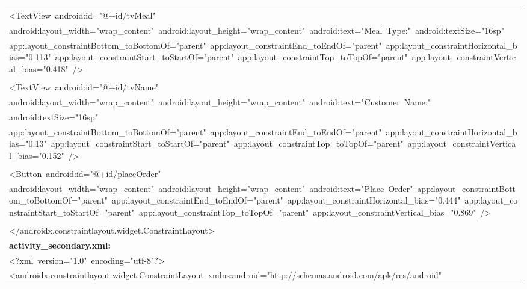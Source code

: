 \documentclass[a4paper,12pt]{article}
\begin{document}
\begin{longtable}{|p{}|}
\strut \\
{\ttfamily\small \textless{}TextView\ android:id="@+id/tvMeal"} \\
{\ttfamily\small android:layout\_width="wrap\_content"\ android:layout\_height="wrap\_content"\ android:text="Meal\ Type:"\ android:textSize="16sp"} \\
{\ttfamily\small app:layout\_constraintBottom\_toBottomOf="parent"\ app:layout\_constraintEnd\_toEndOf="parent"\ app:layout\_constraintHorizontal\_bias="0.113"\ app:layout\_constraintStart\_toStartOf="parent"\ app:layout\_constraintTop\_toTopOf="parent"\ app:layout\_constraintVertical\_bias="0.418"\ /\textgreater{}} \\
\strut \\
{\ttfamily\small \textless{}TextView\ android:id="@+id/tvName"} \\
{\ttfamily\small android:layout\_width="wrap\_content"\ android:layout\_height="wrap\_content"\ android:text="Customer\ Name:"} \\
{\ttfamily\small android:textSize="16sp"} \\
{\ttfamily\small app:layout\_constraintBottom\_toBottomOf="parent"\ app:layout\_constraintEnd\_toEndOf="parent"\ app:layout\_constraintHorizontal\_bias="0.13"\ app:layout\_constraintStart\_toStartOf="parent"\ app:layout\_constraintTop\_toTopOf="parent"\ app:layout\_constraintVertical\_bias="0.152"\ /\textgreater{}} \\
\strut \\
{\ttfamily\small \textless{}Button\ android:id="@+id/placeOrder"} \\
{\ttfamily\small android:layout\_width="wrap\_content"\ android:layout\_height="wrap\_content"\ android:text="Place\ Order"\ app:layout\_constraintBottom\_toBottomOf="parent"\ app:layout\_constraintEnd\_toEndOf="parent"\ app:layout\_constraintHorizontal\_bias="0.444"\ app:layout\_constraintStart\_toStartOf="parent"\ app:layout\_constraintTop\_toTopOf="parent"\ app:layout\_constraintVertical\_bias="0.869"\ /\textgreater{}} \\
\strut \\
{\ttfamily\small \textless{}/androidx.constraintlayout.widget.ConstraintLayout\textgreater{}} \\
\hline
\rule{0pt}{13pt}\textbf{activity\_secondary.xml:} \\
\hline
{\ttfamily\small \textless{}?xml\ version="1.0"\ encoding="utf-8"?\textgreater{}} \\
{\ttfamily\small \textless{}androidx.constraintlayout.widget.ConstraintLayout\ xmlns:android="http://schemas.android.com/apk/res/android"} \\

\end{longtable}
\end{document}
